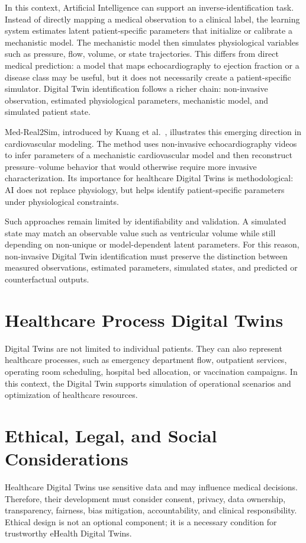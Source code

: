 In this context, Artificial Intelligence can support an inverse-identification task. Instead of directly mapping a medical observation to a clinical label, the learning system estimates latent patient-specific parameters that initialize or calibrate a mechanistic model. The mechanistic model then simulates physiological variables such as pressure, flow, volume, or state trajectories. This differs from direct medical prediction: a model that maps echocardiography to ejection fraction or a disease class may be useful, but it does not necessarily create a patient-specific simulator. Digital Twin identification follows a richer chain: non-invasive observation, estimated physiological parameters, mechanistic model, and simulated patient state.

Med-Real2Sim, introduced by Kuang et al.~\cite{kuang2024medreal2sim}, illustrates this emerging direction in cardiovascular modeling. The method uses non-invasive echocardiography videos to infer parameters of a mechanistic cardiovascular model and then reconstruct pressure--volume behavior that would otherwise require more invasive characterization. Its importance for healthcare Digital Twins is methodological: AI does not replace physiology, but helps identify patient-specific parameters under physiological constraints.

Such approaches remain limited by identifiability and validation. A simulated state may match an observable value such as ventricular volume while still depending on non-unique or model-dependent latent parameters. For this reason, non-invasive Digital Twin identification must preserve the distinction between measured observations, estimated parameters, simulated states, and predicted or counterfactual outputs.

\section{Healthcare Process Digital Twins}
Digital Twins are not limited to individual patients. They can also represent healthcare processes, such as emergency department flow, outpatient services, operating room scheduling, hospital bed allocation, or vaccination campaigns. In this context, the Digital Twin supports simulation of operational scenarios and optimization of healthcare resources.

\section{Ethical, Legal, and Social Considerations}
Healthcare Digital Twins use sensitive data and may influence medical decisions. Therefore, their development must consider consent, privacy, data ownership, transparency, fairness, bias mitigation, accountability, and clinical responsibility. Ethical design is not an optional component; it is a necessary condition for trustworthy eHealth Digital Twins.

